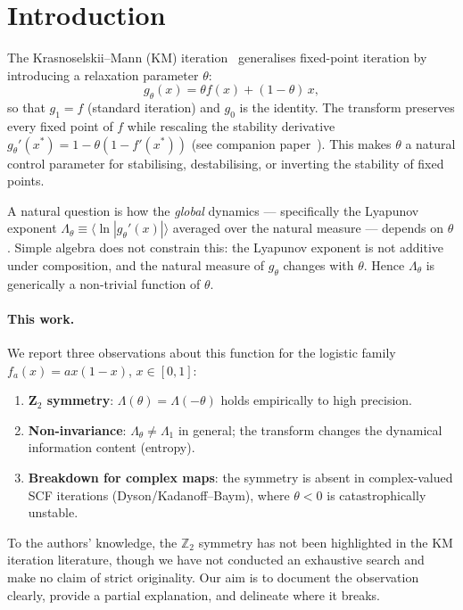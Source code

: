 \documentclass[aps,pre,twocolumn,superscriptaddress,nofootinbib,
               longbibliography,floatfix]{revtex4-2}
\newcommand{\param}{\theta}
\newcommand{\Lam}{\Lambda}
\newcommand{\KMdef}{g_{\param}(x) = \param f(x) + (1-\param)\,x}
\theoremstyle{plain}
\theoremstyle{remark}
\begin{document}
\section{Introduction}
\label{sec:intro}

The Krasnoselskii--Mann (KM) iteration~\cite{Krasnoselskii1955,Mann1953}
generalises fixed-point iteration by introducing a relaxation
parameter $\theta$:
%
\begin{equation}
  \KMdef,
  \label{eq:km}
\end{equation}
%
so that $g_1 = f$ (standard iteration) and $g_0$ is the identity.
The transform preserves every fixed point of $f$ while rescaling
the stability derivative
$g_\theta'(x^*) = 1 - \theta(1-f'(x^*))$
(see companion paper~\cite{DysonPaper}).
This makes $\theta$ a natural control parameter for stabilising,
destabilising, or inverting the stability of fixed points.

A natural question is how the \emph{global} dynamics —
specifically the Lyapunov exponent
$\Lam_\theta \equiv \langle\ln|g_\theta'(x)|\rangle$
averaged over the natural measure — depends on $\theta$.
Simple algebra does not constrain this:
the Lyapunov exponent is not additive under composition, and
the natural measure of $g_\theta$ changes with $\theta$.
Hence $\Lam_\theta$ is generically a non-trivial function of $\theta$.

\paragraph{This work.}
We report three observations about this function for the logistic
family $f_a(x) = ax(1-x)$, $x \in [0,1]$:
%
\begin{enumerate}
  \item \textbf{Z$_2$ symmetry}: $\Lam(\theta) = \Lam(-\theta)$
    holds empirically to high precision.
  \item \textbf{Non-invariance}: $\Lam_\theta \neq \Lam_1$ in
    general; the transform changes the dynamical information
    content (entropy).
  \item \textbf{Breakdown for complex maps}:
    the symmetry is absent in complex-valued SCF iterations
    (Dyson/Kadanoff--Baym), where $\theta < 0$ is
    catastrophically unstable.
\end{enumerate}
%
To the authors' knowledge, the $\mathbb{Z}_2$ symmetry has not
been highlighted in the KM iteration literature, though we have
not conducted an exhaustive search and make no claim of strict
originality.  Our aim is to document the observation clearly,
provide a partial explanation, and delineate where it breaks.
\end{document}
